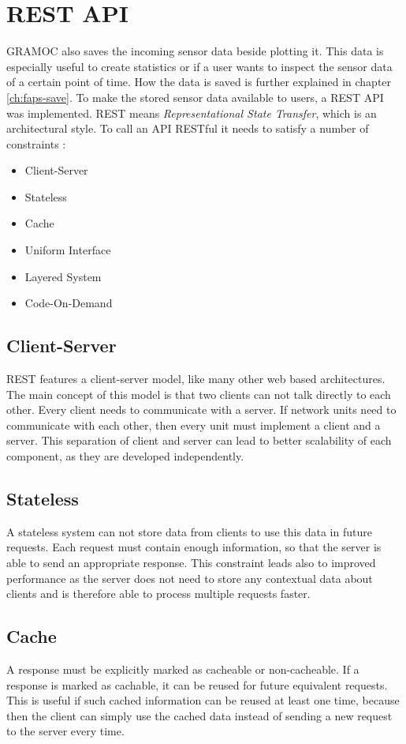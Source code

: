 \section{REST API}
\label{sec:restapi}
GRAMOC also saves the incoming sensor data beside plotting it. This data is especially useful to create statistics or if a user wants to inspect the sensor data of a certain point of time. How the data is saved is further explained in chapter \vref{ch:faps-save}. To make the stored sensor data available to users, a REST API was implemented.
REST means \textit{Representational State Transfer}, which is an architectural style. To call an API RESTful it needs to satisfy a number of constraints \autocite{rest}:

\begin{itemize}
    \item Client-Server
    \item Stateless
    \item Cache
    \item Uniform Interface
    \item Layered System
    \item Code-On-Demand
\end{itemize}

\subsection{Client-Server}
REST features a client-server model, like many other web based architectures. The main concept of this model is that two clients can not talk directly to each other. Every client needs to communicate with a server. If network units need to communicate with each other, then every unit must implement a client and a server. This separation of client and server can lead to better scalability of each component, as they are developed independently.

\subsection{Stateless}
A stateless system can not store data from clients to use this data in future requests. Each request must contain enough information, so that the server is able to send an appropriate response. This constraint leads also to improved performance as the server does not need to store any contextual data about clients and is therefore able to process multiple requests faster.

\subsection{Cache}
A response must be explicitly marked as cacheable or non-cacheable. If a response is marked as cachable, it can be reused for future equivalent requests. This is useful if such cached information can be reused at least one time, because then the client can simply use the cached data instead of sending a new request to the server every time.

